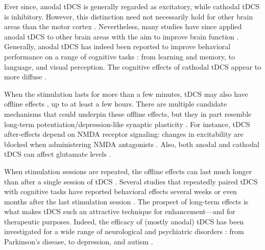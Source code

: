 \documentclass[11pt,]{memoir}
\begin{document}
Ever since, anodal tDCS is generally regarded as excitatory, while cathodal tDCS is inhibitory. However, this distinction need not necessarily hold for other brain areas than the motor cortex \autocites{Bestmann2017}{Parkin2015}. Nevertheless, many studies have since applied anodal tDCS to other brain areas with the aim to improve brain function \autocite{Grossman2018}. Generally, anodal tDCS has indeed been reported to improve behavioral performance on a range of cognitive tasks \autocites{Coffman2014}{Santarnecchi2015}: from learning and memory, to language, and visual perception. The cognitive effects of cathodal tDCS appear to more diffuse \autocite{Jacobson2012}.

When the stimulation lasts for more than a few minutes, tDCS may also have offline effects \autocites{Bindman1964}{Nitsche2001}, up to at least a few hours. There are multiple candidate mechanisms that could underpin these offline effects, but they in part resemble long-term potentiation/depression-like synaptic plasticity \autocite{Bikson2019}. For instance, tDCS after-effects depend on NMDA receptor signaling: changes in excitability are blocked when administering NMDA antagonists \autocites{Liebetanz2002}{Nitsche2003}. Also, both anodal and cathodal tDCS can affect glutamate levels \autocites{Clark2011}{Stagg2009}.

When stimulation sessions are repeated, the offline effects can last much longer than after a single session of tDCS \autocite{Monte-Silva2013}. Several studies that repeatedly paired tDCS with cognitive tasks have reported behavioral effects several weeks or even months after the last stimulation session \autocites[e.g.,][]{Filmer2016}{Looi2016a}{Snowball2013}[but see][]{Nilsson2017}. The prospect of long-term effects is what makes tDCS such an attractive technique for enhancement---and for therapeutic purposes. Indeed, the efficacy of (mostly anodal) tDCS has been investigated for a wide range of neurological and psychiatric disorders \autocite{Lefaucheur2016}: from Parkinson's disease, to depression, and autism \autocite{Lefaucheur2016a}.
\end{document}
